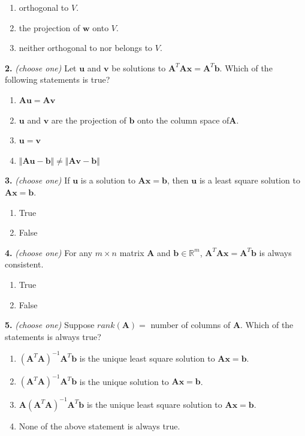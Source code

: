 \documentclass[10pt,a4paper]{article}
\begin{document}
\begin{enumerate}[label=(\Alph*)]
\item orthogonal to \(V\).
\item the projection of \(\mathbf w\) onto \(V\).
\item neither orthogonal to nor belongs to \(V\).
\end{enumerate}
\smallskip
\textbf{2.} \textit{(choose one)} Let \(\mathbf{u}\) and \(\mathbf{v}\) be solutions to \(\mathbf{A}^T\mathbf{Ax=A}^T\mathbf{b}\). Which of the following statements is true?

\begin{enumerate}[label=(\Alph*)]
\item \(\mathbf{Au=Av}\)
\item \(\mathbf{u}\) and \(\mathbf{v}\) are the projection of \(\mathbf{b}\) onto the column space of\(\mathbf{A}\).
\item \(\mathbf{u=v}\)
\item \(\Vert\mathbf{Au-b}\Vert\neq\Vert\mathbf{Av-b}\Vert\)
\end{enumerate}
\smallskip
\textbf{3.} \textit{(choose one)} If \(\mathbf{u}\) is a solution to \(\mathbf{Ax=b}\), then \(\mathbf{u}\) is a least square solution to \(\mathbf{Ax=b}\).

\begin{enumerate}[label=(\Alph*)]
\item True
\item False
\end{enumerate}
\smallskip
\textbf{4.} \textit{(choose one)} For any \(m\times n\) matrix \(\mathbf{A}\) and \(\mathbf{b}\in\mathbb{R}^m\), \(\mathbf{A}^T\mathbf{Ax}=\mathbf{A}^T\mathbf{b}\) is always consistent.

\begin{enumerate}[label=(\Alph*)]
\item True
\item False
\end{enumerate}
\smallskip
\textbf{5.} \textit{(choose one)} Suppose \(rank(\mathbf{A})=\) number of columns of \(\mathbf{A}\). Which of the statements is always true?

\begin{enumerate}[label=(\Alph*)]
\item \((\mathbf{A}^T\mathbf{A})^{-1}\mathbf{A}^T\mathbf{b}\) is the unique least square solution to \(\mathbf{Ax=b}\).
\item \((\mathbf{A}^T\mathbf{A})^{-1}\mathbf{A}^T\mathbf{b}\) is the unique solution to \(\mathbf{Ax=b}\).
\item \(\mathbf{A}(\mathbf{A}^T\mathbf{A})^{-1}\mathbf{A}^T\mathbf{b}\) is the unique least square solution to \(\mathbf{Ax=b}\).
\item None of the above statement is always true.
\end{enumerate}
\smallskip
\end{document}
